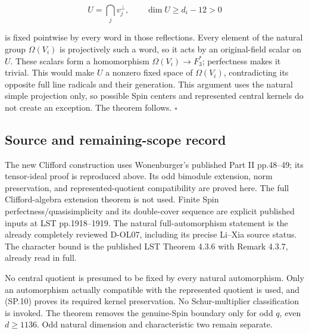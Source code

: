 \[
 U=\bigcap_j v_j^\perp,
 \qquad \dim U\ge d_i-12>0
 \tag{SP.18}
\]

is fixed pointwise by every word in those reflections. Every element of the natural group \(\Omega(V_i)\) is projectively such a word, so it acts by an original-field scalar on \(U\). These scalars form a homomorphism \(\Omega(V_i)\to F_3^*\); perfectness makes it trivial. This would make \(U\) a nonzero fixed space of \(\Omega(V_i)\), contradicting its opposite full line radicals and their generation. This argument uses the natural simple projection only, so possible Spin centers and represented central kernels do not create an exception. The theorem follows. \(\square\)

\subsection{Source and remaining-scope record}\label{SF-SPIN:source-and-remaining-scope-record}

The new Clifford construction uses Wonenburger's published Part II pp.48--49; its tensor-ideal proof is reproduced above. Its odd bimodule extension, norm preservation, and represented-quotient compatibility are proved here. The full Clifford-algebra extension theorem is not used. Finite Spin perfectness/quasisimplicity and its double-cover sequence are explicit published inputs at LST pp.1918--1919. The natural full-automorphism statement is the already completely reviewed D-OL07, including its precise Li--Xia source status. The character bound is the published LST Theorem 4.3.6 with Remark 4.3.7, already read in full.

No central quotient is presumed to be fixed by every natural automorphism. Only an automorphism actually compatible with the represented quotient is used, and (SP.10) proves its required kernel preservation. No Schur-multiplier classification is invoked. The theorem removes the genuine-Spin boundary only for odd \(q\), even \(d\ge1136\). Odd natural dimension and characteristic two remain separate.
